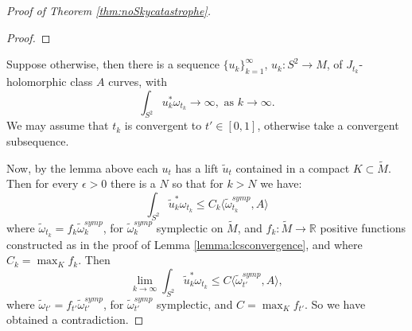 \documentclass{amsart}
\numberwithin{equation}{section}
\theoremstyle{definition}
\theoremstyle{remark}
\begin{document}
\begin{proof} [Proof of Theorem \ref{thm:noSkycatastrophe}]
\begin{proof}
%
%
%
\end{proof}
  
    Suppose otherwise, then there is a sequence $\{u _{k} \} _{k=1} ^{\infty}$, $u _{k}: S ^{2}  \to M$, of $J _{t _{k} } $-holomorphic class $A$ curves, with $$  \int _{S ^{2} } u _{k} ^{*} \omega _{t _{k}} \to \infty, \text{ as $k \to \infty$}.   $$
    We may assume that $t _{k} $ is convergent to $t'  \in [0,1] $, otherwise take a convergent subsequence.  
% 


Now, by the lemma above each $u _{t} $ has a lift $\widetilde{u}_{t}$ contained in a compact $K \subset \widetilde{M} $. Then for every $\epsilon>0$ there is a $N$ so that for $k>N$ we have: 
   \begin{equation*}
      \int _{ S ^{2}} \widetilde{u} _{k} ^{*} \omega _{t _{k}}    \leq 
 C _{k} \langle \widetilde{\omega } _{t _{k}}  ^{symp}  , A  \rangle
 \end{equation*}
where $\widetilde{\omega} _{t _{k} } = f _{k}  \widetilde{\omega}  ^{symp} _{k} $, for $\widetilde{\omega} ^{symp} _{k} $ symplectic on $\widetilde{M}$, and  
$f _{k}: \widetilde{M} \to \mathbb{R}$ positive functions constructed as in the proof of Lemma \ref{lemma:lcsconvergence}, and where $C _{k} = \max _{K} f _{k}   $. 
Then 
\begin{equation*}
\lim _{k \to \infty} \int _{ S ^{2}} \widetilde{u} _{k} ^{*} \omega _{t _{k}} \leq C  \langle \widetilde{\omega } _{t'}  ^{symp}, A  \rangle,
\end{equation*}
where $\widetilde{\omega} _{t'}  = f _{t'}  \widetilde{\omega}  ^{symp} _{t'}  $, for  $\widetilde{\omega}  ^{symp} _{t'}  $ symplectic, and $C=\max _{K} f _{t'}  $.
So we have obtained a contradiction.


\end{proof}
\end{document}
